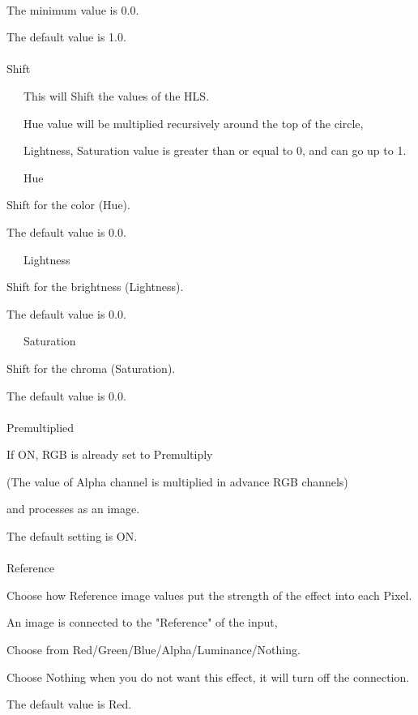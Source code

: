 \documentclass[a4paper,12pt]{article}
\begin{document}
\newpage

\thispagestyle{empty}

\ \vspace{-0.2em}
\par
The minimum value is 0.0.\par
The default value is 1.0.\\
\\
Shift\par
\noindent \ \ \, This will Shift the values of the HLS.\par
\noindent \ \ \, Hue value will be multiplied recursively around the top of the circle,\par
\noindent \ \ \, Lightness, Saturation value is greater than or equal to 0, and can go up to 1.\\
\par
\noindent \ \ \, Hue\par
Shift for the color (Hue).\par
The default value is 0.0.\par
\noindent \ \ \, Lightness\par
Shift for the brightness (Lightness).\par
The default value is 0.0.\par
\noindent \ \ \, Saturation\par
Shift for the chroma (Saturation).\par
The default value is 0.0.\\
\\
Premultiplied\par
If ON, RGB is already set to Premultiply\par
(The value of Alpha channel is multiplied in advance RGB channels)\par
and processes as an image.\par
The default setting is ON.\\
\\
Reference\par
Choose how Reference image values put the strength of the effect into each Pixel.\par
An image is connected to the "Reference" of the input,\par
Choose from Red/Green/Blue/Alpha/Luminance/Nothing.\par
Choose Nothing when you do not want this effect, it will turn off the connection.\par
The default value is Red.
\end{document}
